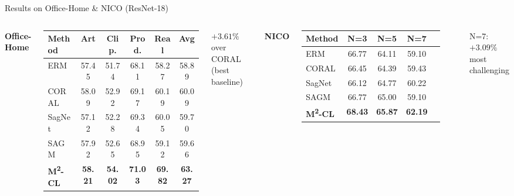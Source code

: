 \documentclass[aspectratio=169,10pt]{beamer}
\newcommand{\tablehl}{\rowcolor{LightBlue!60}}
\begin{document}
\begin{frame}{Results on Office-Home \& NICO (ResNet-18)}
  \begin{columns}[T]
      \textbf{Office-Home}
      \vspace{0.2em}
      \small
      \begin{tabular}{@{}lccccc@{}}
        \toprule
        \textbf{Method} & \textbf{Art} & \textbf{Clip.} & \textbf{Prod.} & \textbf{Real} & \textbf{Avg} \\
        \midrule
        ERM    & 57.45 & 51.74 & 68.11 & 58.27 & 58.89 \\
        CORAL  & 58.09 & 52.92 & 69.17 & 60.19 & 60.09 \\
        SagNet & 57.12 & 52.28 & 69.34 & 60.05 & 59.70 \\
        SAGM   & 57.92 & 52.65 & 68.95 & 59.12 & 59.66 \\
        \midrule
        \tablehl
        \textbf{M\textsuperscript{2}-CL} & \textbf{58.21} & \textbf{54.02} & \textbf{71.03} & \textbf{69.82} & \textbf{63.27} \\
        \bottomrule
      \end{tabular}

      \vspace{0.3em}
      \begin{alertblock}{\small $+3.61\%$ over CORAL (best baseline)}
      \end{alertblock}

      \textbf{NICO}
      \vspace{0.2em}
      \small
      \begin{tabular}{@{}lcccc@{}}
        \toprule
        \textbf{Method} & \textbf{N=3} & \textbf{N=5} & \textbf{N=7} \\
        \midrule
        ERM     & 66.77 & 64.11 & 59.10 \\
        CORAL   & 66.45 & 64.39 & 59.43 \\
        SagNet  & 66.12 & 64.77 & 60.22 \\
        SAGM    & 66.77 & 65.00 & 59.10 \\
        \midrule
        \tablehl
        \textbf{M\textsuperscript{2}-CL} & \textbf{68.43} & \textbf{65.87} & \textbf{62.19} \\
        \bottomrule
      \end{tabular}

      \vspace{0.3em}
      \begin{exampleblock}{\small N=7: $+3.09\%$ most challenging}
      \end{exampleblock}
  \end{columns}
\end{frame}
\end{document}
